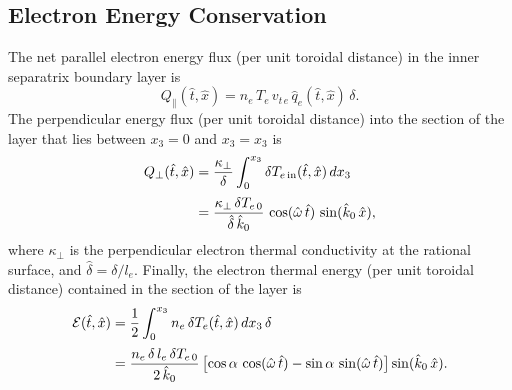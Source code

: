 \documentclass[12pt,prb,aps]{revtex4-1}
\begin{document}
\subsection{Electron Energy Conservation}
The net parallel electron energy flux (per unit toroidal distance) in the inner separatrix boundary layer is
\begin{equation}
Q_\parallel (\hat{t},\hat{x})= n_e\,T_e\,v_{t\,e}\,\hat{q}_e(\hat{t},\hat{x})\,\delta.
\end{equation}
The perpendicular energy flux  (per unit toroidal distance)  into the section of the layer that lies between $x_3=0$ and $x_3=x_3$ is
\begin{align}
Q_\perp (\hat{t},\hat{x}) &= \frac{\kappa_\perp}{\delta} \int_0^{x_3}\delta T_{e\,{\rm in}}(\hat{t},\hat{x})\,dx_3\nonumber\\[0.5ex]
&= \frac{\kappa_\perp\,\delta T_{e\,0}}{\hat{\delta}\,\hat{k}_0}\,\cos(\hat{\omega}\,\hat{t})\,\sin(\hat{k}_0\,\hat{x}),
\end{align}
where $\kappa_\perp$ is the perpendicular electron thermal conductivity at the rational surface, and $\hat{\delta}=\delta/l_e$. Finally, the  electron thermal energy  (per unit toroidal distance) contained in the section of the layer is
\begin{align}
{\cal E}(\hat{t},\hat{x})&=\frac{1}{2}\int_0^{x_3} n_e\,\delta T_e(\hat{t},\hat{x})\,dx_3\,\delta\nonumber\\[0.5ex]
& = \frac{n_e\,\delta\,l_e\,\delta T_{e\,0}}{2\,\hat{k}_0}\left[\cos\alpha\,\cos(\hat{\omega}\,\hat{t})-\sin\alpha\,\sin(\hat{\omega}\,\hat{t})\right]
\sin(\hat{k}_0\,\hat{x}).
\end{align}
\end{document}
